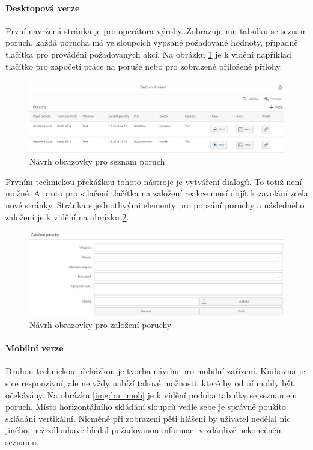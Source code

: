 \documentclass[thesis=M,czech]{FITthesis}[2012/06/26]
\begin{document}
\paragraph{Desktopová verze}
První navržená stránka je pro operátora výroby. Zobrazuje mu tabulku se seznam poruch. každá porucha má ve sloupcích vypsané požadované hodnoty, případně tlačítka pro provádění požadovaných akcí. Na obrázku \ref{img:bu_poruchy_seznam} je k vidění například tlačítko pro započetí práce na poruše nebo pro zobrazené přiložené přílohy. 
\begin{figure}[H]
	\centering
	\includegraphics[width=1\textwidth]{images/bu_poruchy_seznam}
	\caption{Návrh obrazovky pro seznam poruch}
	\label{img:bu_poruchy_seznam}
\end{figure}
Prvním technickou překážkou tohoto nástroje je vytváření dialogů. To totiž není možné. A proto pro stlačení tlačítka na založení reakce musí dojít k zavolání zcela nové stránky. Stránka s jednotlivými elementy pro popsání poruchy a následného založení je k vidění na obrázku \ref{img:bu_zalozeni_poruchy}. 
\begin{figure}[H]
	\centering
	\includegraphics[width=1\textwidth]{images/bu_zalozeni_poruchy}
	\caption{Návrh obrazovky pro založení poruchy}
	\label{img:bu_zalozeni_poruchy}
\end{figure}

\paragraph{Mobilní verze}
Druhou technickou překážkou je tvorba návrhu pro mobilní zařízení. Knihovna  je sice responzivní, ale ne vždy nabízí takové možnosti, které by od ní mohly být očekávány. Na obrázku \ref{img:bu_mob} je k vidění podoba tabulky se seznamem poruch. Místo horizontálního skládání sloupců vedle sebe je správně použito skládání vertikální. Nicméně při zobrazení pěti hlášení by uživatel nedělal nic jiného, než zdlouhavě hledal požadovanou informaci v zdánlivě nekonečném seznamu.
\end{document}
